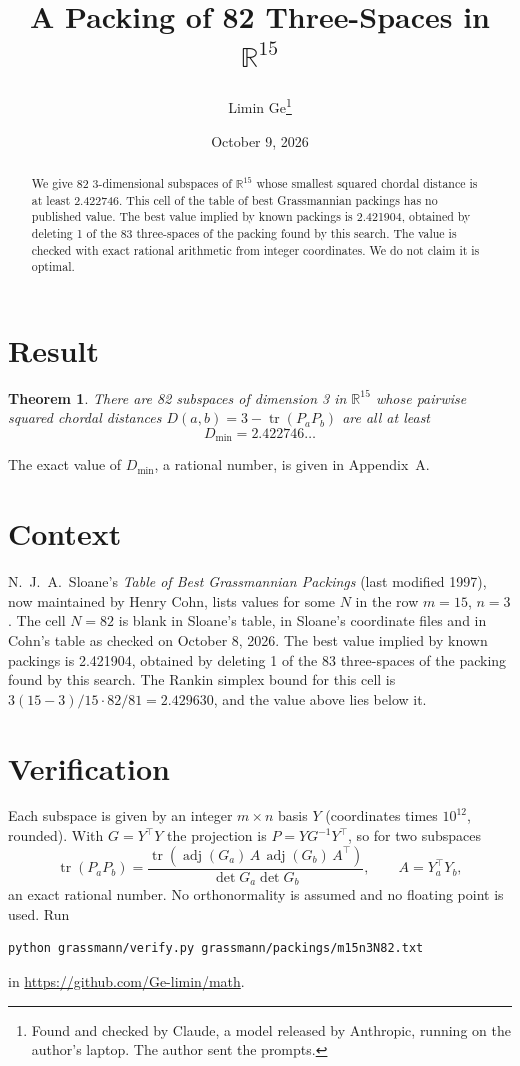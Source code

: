 \documentclass[11pt,a4paper]{article}
\title{A Packing of 82 Three-Spaces in $\mathbb{R}^{15}$}
\author{Limin Ge\thanks{Found and checked by Claude, a model released by Anthropic, running on the author's laptop. The author sent the prompts.}}
\date{October 9, 2026}
\newtheorem*{theorem}{Theorem}
\begin{document}
\maketitle
\begin{abstract}
We give 82 3-dimensional subspaces of $\mathbb{R}^{15}$ whose smallest squared chordal distance is at least 2.422746. This cell of the table of best Grassmannian packings has no published value. The best value implied by known packings is 2.421904, obtained by deleting 1 of the 83 three-spaces of the packing found by this search. The value is checked with exact rational arithmetic from integer coordinates. We do not claim it is optimal.
\end{abstract}

\section{Result}
\begin{theorem}
There are 82 subspaces of dimension 3 in $\mathbb{R}^{15}$ whose pairwise squared chordal distances $D(a,b) = 3 - \operatorname{tr}(P_aP_b)$ are all at least
\[ D_{\min} = 2.422746\ldots \]
\end{theorem}
The exact value of $D_{\min}$, a rational number, is given in Appendix~A.


\section{Context}
N.~J.~A.~Sloane's \emph{Table of Best Grassmannian Packings} (last modified 1997), now maintained by Henry Cohn, lists values for some $N$ in the row $m=15$, $n=3$. The cell $N=82$ is blank in Sloane's table, in Sloane's coordinate files and in Cohn's table as checked on October 8, 2026. The best value implied by known packings is 2.421904, obtained by deleting 1 of the 83 three-spaces of the packing found by this search. The Rankin simplex bound for this cell is $3(15-3)/15\cdot 82/81 = 2.429630$, and the value above lies below it.


\section{Verification}
Each subspace is given by an integer $m\times n$ basis $Y$ (coordinates times $10^{12}$, rounded). With $G=Y^\top Y$ the projection is $P=YG^{-1}Y^\top$, so for two subspaces
\[ \operatorname{tr}(P_aP_b)=\frac{\operatorname{tr}(\operatorname{adj}(G_a)\,A\,\operatorname{adj}(G_b)\,A^\top)}{\det G_a\det G_b},\qquad A=Y_a^\top Y_b, \]
an exact rational number. No orthonormality is assumed and no floating point is used. Run
\begin{verbatim}
python grassmann/verify.py grassmann/packings/m15n3N82.txt
\end{verbatim}
in \url{https://github.com/Ge-limin/math}.
\end{document}
